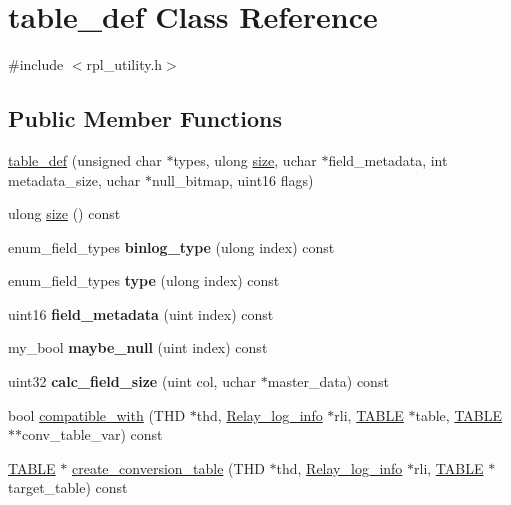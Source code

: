 \hypertarget{classtable__def}{}\section{table\+\_\+def Class Reference}
\label{classtable__def}


{\ttfamily \#include $<$rpl\+\_\+utility.\+h$>$}

\subsection*{Public Member Functions}
\begin{DoxyCompactItemize}
\item 
\mbox{\hyperlink{classtable__def_a659c3d889db3ab3c2cc3f3cb591587e5}{table\+\_\+def}} (unsigned char $\ast$types, ulong \mbox{\hyperlink{classtable__def_a793dcd937355e094a90d55e2e1bca1c4}{size}}, uchar $\ast$field\+\_\+metadata, int metadata\+\_\+size, uchar $\ast$null\+\_\+bitmap, uint16 flags)
\item 
ulong \mbox{\hyperlink{classtable__def_a793dcd937355e094a90d55e2e1bca1c4}{size}} () const
\item 
\mbox{\label{classtable__def_aa9c2710f4c4bc50ef6307226eb276cb4}} 
enum\+\_\+field\+\_\+types {\bfseries binlog\+\_\+type} (ulong index) const
\item 
\mbox{\label{classtable__def_a3ea2417ae94fbad9428f7fe96a385953}} 
enum\+\_\+field\+\_\+types {\bfseries type} (ulong index) const
\item 
\mbox{\label{classtable__def_ac21e2a53311720f21828abdd20978223}} 
uint16 {\bfseries field\+\_\+metadata} (uint index) const
\item 
\mbox{\label{classtable__def_a261962eba5092696b8a29cff0c8874f1}} 
my\+\_\+bool {\bfseries maybe\+\_\+null} (uint index) const
\item 
\mbox{\label{classtable__def_ab06efb289dfb4b090bb9d25986577191}} 
uint32 {\bfseries calc\+\_\+field\+\_\+size} (uint col, uchar $\ast$master\+\_\+data) const
\item 
bool \mbox{\hyperlink{classtable__def_aedd263d15199083d64b5ba5beaf1eb5a}{compatible\+\_\+with}} (T\+HD $\ast$thd, \mbox{\hyperlink{classRelay__log__info}{Relay\+\_\+log\+\_\+info}} $\ast$rli, \mbox{\hyperlink{structTABLE}{T\+A\+B\+LE}} $\ast$table, \mbox{\hyperlink{structTABLE}{T\+A\+B\+LE}} $\ast$$\ast$conv\+\_\+table\+\_\+var) const
\item 
\mbox{\hyperlink{structTABLE}{T\+A\+B\+LE}} $\ast$ \mbox{\hyperlink{classtable__def_af38e9a5ab04ee617226b5473b612857b}{create\+\_\+conversion\+\_\+table}} (T\+HD $\ast$thd, \mbox{\hyperlink{classRelay__log__info}{Relay\+\_\+log\+\_\+info}} $\ast$rli, \mbox{\hyperlink{structTABLE}{T\+A\+B\+LE}} $\ast$target\+\_\+table) const
\end{DoxyCompactItemize}


